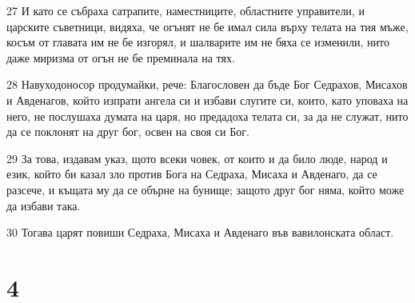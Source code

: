 \par 27 И като се събраха сатрапите, наместниците, областните управители, и царските съветници, видяха, че огънят не бе имал сила върху телата на тия мъже, косъм от главата им не бе изгорял, и шалварите им не бяха се изменили, нито даже миризма от огън не бе преминала на тях.
\par 28 Навуходоносор продумайки, рече: Благословен да бъде Бог Седрахов, Мисахов и Авденагов, който изпрати ангела си и избави слугите си, които, като уповаха на него, не послушаха думата на царя, но предадоха телата си, за да не служат, нито да се поклонят на друг бог, освен на своя си Бог.
\par 29 За това, издавам указ, щото всеки човек, от които и да било люде, народ и език, който би казал зло против Бога на Седраха, Мисаха и Авденаго, да се разсече, и къщата му да се обърне на бунище; защото друг бог няма, който може да избави така.
\par 30 Тогава царят повиши Седраха, Мисаха и Авденаго във вавилонската област.

\chapter{4}

